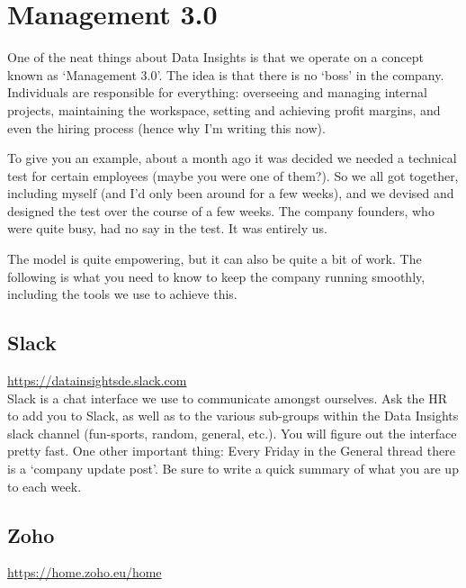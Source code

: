 \documentclass[11pt]{report}
\begin{document}
\section{Management 3.0}
One of the neat things about Data Insights is that we operate on a concept known as `Management 3.0'. The idea is that there is no `boss' in the company. Individuals are responsible for everything: overseeing and managing internal projects, maintaining the workspace, setting and achieving profit margins, and even the hiring process (hence why I'm writing this now).

To give you an example, about a month ago it was decided we needed a technical test for certain employees (maybe you were one of them?). So we all got together, including myself (and I'd only been around for a few weeks), and we devised and designed the test over the course of a few weeks. The company founders, who were quite busy, had no say in the test. It was entirely us.

The model is quite empowering, but it can also be quite a bit of work. The following is what you need to know to keep the company running smoothly, including the tools we use to achieve this.

\subsection{Slack}
\label{Slack}
\href{https://datainsightsde.slack.com}{https://datainsightsde.slack.com}\\

Slack is a chat interface we use to communicate amongst ourselves. Ask the HR to add you to Slack, as well as to the various sub-groups within the Data Insights slack channel (fun-sports, random, general, etc.). You will figure out the interface pretty fast. One other important thing: Every Friday in the General thread there is a `company update post'. Be sure to write a quick summary of what you are up to each week.

\subsection {Zoho}
\label{Zoho}
\href{https://home.zoho.eu/home}{https://home.zoho.eu/home}\\
\end{document}
